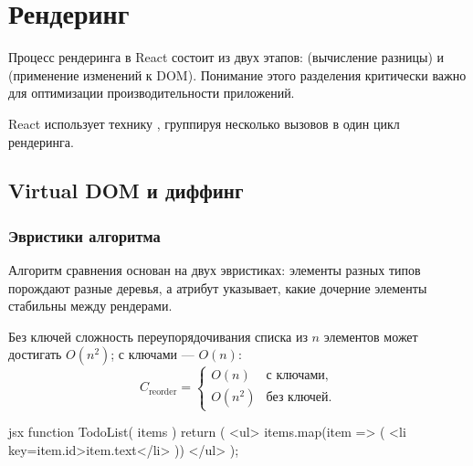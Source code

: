 \section{Рендеринг}

Процесс рендеринга в React состоит из двух этапов:
 (вычисление разницы) и
 (применение изменений к DOM).
Понимание этого разделения критически важно для оптимизации
производительности приложений.

React использует технику ,
группируя несколько вызовов  в один цикл рендеринга.

\subsection{Virtual DOM и диффинг}

\subsubsection{Эвристики алгоритма}

Алгоритм сравнения основан на двух эвристиках: элементы разных типов
порождают разные деревья, а атрибут  указывает, какие
дочерние элементы стабильны между рендерами.

Без ключей сложность переупорядочивания списка из $n$ элементов
может достигать $O(n^2)$; с ключами — $O(n)$:
\begin{equation}
  C_{\text{reorder}} = \begin{cases}
    O(n)   & \text{с ключами,}\\
    O(n^2) & \text{без ключей.}
  \end{cases}
\end{equation}

\begin{code}{jsx}
function TodoList({ items }) {
  return (
    <ul>
      {items.map(item => (
        <li key={item.id}>{item.text}</li>
      ))}
    </ul>
  );
}
\end{code}


